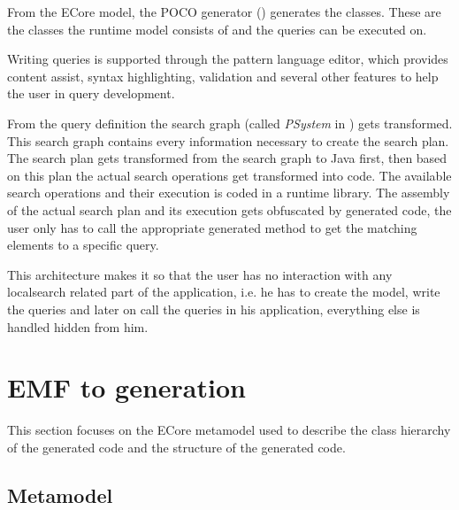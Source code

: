 From the ECore model, the POCO generator ()
generates the \CPP{} classes. These are the classes the runtime model consists
of and the queries can be executed on.

Writing queries is supported through the \EIQ{} pattern language editor, which
provides content assist, syntax highlighting, validation and several other
features to help the user in query development.

From the query definition the search graph (called \emph{PSystem} in
\EIQ{}) gets transformed. This search graph contains every information
necessary to create the search plan. The search plan gets transformed from the
search graph to Java first, then based on this plan the actual search operations
get transformed into \CPP{} code. The available search operations and their
execution is coded in a runtime library. The assembly of the actual search plan
and its execution gets obfuscated by generated code, the user only has to call
the appropriate generated method to get the matching elements to a specific query.

This architecture makes it so that the user has no interaction with any
localsearch related part of the application, i.e. he has to create the model,
write the queries and later on call the queries in his \CPP{} application,
everything else is handled hidden from him.

\section{EMF to \CPP{} generation} \label{sect:CppObjectModel}

This section focuses on the ECore metamodel used to describe the class hierarchy
of the generated code and the structure of the generated code.

\subsection{Metamodel}\label{sec:Metamodel}

